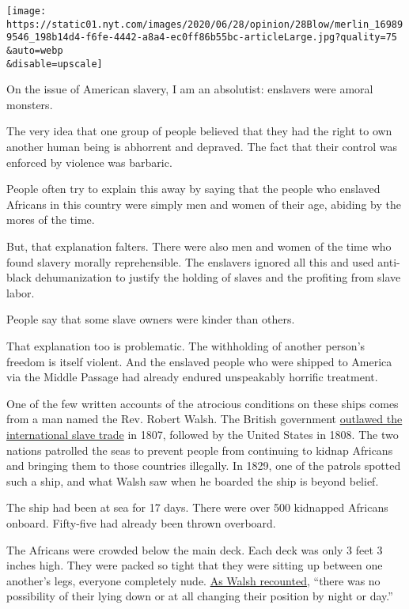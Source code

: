 \texttt{[image: https://static01.nyt.com/images/2020/06/28/opinion/28Blow/merlin\_169899546\_198b14d4-f6fe-4442-a8a4-ec0ff86b55bc-articleLarge.jpg?quality=75\\\&auto=webp\\\&disable=upscale]}

On the issue of American slavery, I am an absolutist: enslavers were
amoral monsters.

The very idea that one group of people believed that they had the right
to own another human being is abhorrent and depraved. The fact that
their control was enforced by violence was barbaric.

People often try to explain this away by saying that the people who
enslaved Africans in this country were simply men and women of their
age, abiding by the mores of the time.

But, that explanation falters. There were also men and women of the time
who found slavery morally reprehensible. The enslavers ignored all this
and used anti-black dehumanization to justify the holding of slaves and
the profiting from slave labor.

People say that some slave owners were kinder than others.

That explanation too is problematic. The withholding of another person's
freedom is itself violent. And the enslaved people who were shipped to
America via the Middle Passage had already endured unspeakably horrific
treatment.

One of the few written accounts of the atrocious conditions on these
ships comes from a man named the Rev. Robert Walsh. The British
government
\href{https://www.thirteen.org/wnet/historyofus/web05/features/source/C04.html}{outlawed
the international slave trade} in 1807, followed by the United States in
1808. The two nations patrolled the seas to prevent people from
continuing to kidnap Africans and bringing them to those countries
illegally. In 1829, one of the patrols spotted such a ship, and what
Walsh saw when he boarded the ship is beyond belief.

The ship had been at sea for 17 days. There were over 500 kidnapped
Africans onboard. Fifty-five had already been thrown overboard.

The Africans were crowded below the main deck. Each deck was only 3 feet
3 inches high. They were packed so tight that they were sitting up
between one another's legs, everyone completely nude.
\href{https://www.thirteen.org/wnet/historyofus/web05/features/source/docs/C04.pdf}{As
Walsh recounted}, ``there was no possibility of their lying down or at
all changing their position by night or day.''

